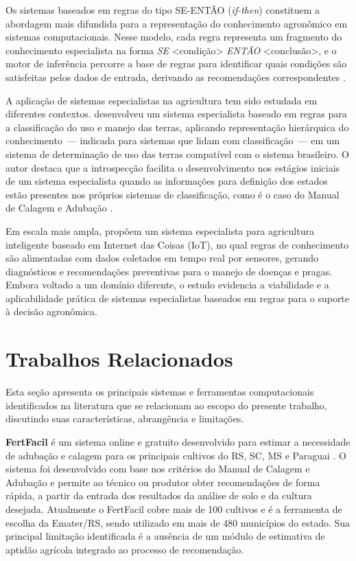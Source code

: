 Os sistemas baseados em regras do tipo SE-ENTÃO (\textit{if-then})
constituem a abordagem mais difundida para a representação do conhecimento
agronômico em sistemas computacionais. Nesse modelo, cada regra representa
um fragmento do conhecimento especialista na forma
\textit{SE} <condição> \textit{ENTÃO} <conclusão>, e o motor de inferência
percorre a base de regras para identificar quais condições são satisfeitas
pelos dados de entrada, derivando as recomendações correspondentes
\citep{Lanzer2010}.

A aplicação de sistemas especialistas na agricultura tem sido estudada em
diferentes contextos. \cite{Lanzer2010} desenvolveu um sistema especialista
baseado em regras para a classificação do uso e manejo das terras, aplicando
representação hierárquica do conhecimento~--- indicada para sistemas que lidam
com classificação~--- em um sistema de determinação de uso das terras compatível
com o sistema brasileiro. O autor destaca que a introspecção facilita o
desenvolvimento nos estágios iniciais de um sistema especialista quando as
informações para definição dos estados estão presentes nos próprios sistemas
de classificação, como é o caso do Manual de Calagem e Adubação
\citep{ManualCalagem2016}.

Em escala mais ampla, \cite{Shahzadi2016} propõem um sistema especialista
para agricultura inteligente baseado em Internet das Coisas (IoT), no qual
regras de conhecimento são alimentadas com dados coletados em tempo real por
sensores, gerando diagnósticos e recomendações preventivas para o manejo de
doenças e pragas. Embora voltado a um domínio diferente, o estudo evidencia
a viabilidade e a aplicabilidade prática de sistemas especialistas baseados
em regras para o suporte à decisão agronômica.

\section{Trabalhos Relacionados}

Esta seção apresenta os principais sistemas e ferramentas computacionais
identificados na literatura que se relacionam ao escopo do presente trabalho,
discutindo suas características, abrangência e limitações.

\textbf{FertFacil} é um sistema online e gratuito desenvolvido para estimar
a necessidade de adubação e calagem para os principais cultivos do RS, SC,
MS e Paraguai \citep{Tiecher2016}. O sistema foi desenvolvido com base nos
critérios do Manual de Calagem e Adubação e permite ao técnico ou produtor
obter recomendações de forma rápida, a partir da entrada dos resultados da
análise de solo e da cultura desejada. Atualmente o FertFacil cobre mais de
100 cultivos e é a ferramenta de escolha da Emater/RS, sendo utilizado em
mais de 480 municípios do estado. Sua principal limitação identificada é a
ausência de um módulo de estimativa de aptidão agrícola integrado ao processo
de recomendação.

